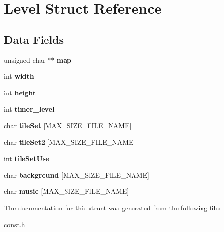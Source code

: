\hypertarget{struct_level}{\section{Level Struct Reference}
\label{struct_level}
}
\subsection*{Data Fields}
\begin{DoxyCompactItemize}
\item 
\hypertarget{struct_level_a6d985f8729c187f1c35dabba2738f0bd}{unsigned char $\ast$$\ast$ {\bfseries map}}\label{struct_level_a6d985f8729c187f1c35dabba2738f0bd}

\item 
\hypertarget{struct_level_a2474a5474cbff19523a51eb1de01cda4}{int {\bfseries width}}\label{struct_level_a2474a5474cbff19523a51eb1de01cda4}

\item 
\hypertarget{struct_level_ad12fc34ce789bce6c8a05d8a17138534}{int {\bfseries height}}\label{struct_level_ad12fc34ce789bce6c8a05d8a17138534}

\item 
\hypertarget{struct_level_a28c59da9677a9d7b98db49328a77dc3c}{int {\bfseries timer\-\_\-level}}\label{struct_level_a28c59da9677a9d7b98db49328a77dc3c}

\item 
\hypertarget{struct_level_a65e1491050070e8d940ac310bb3ee901}{char {\bfseries tile\-Set} \mbox{[}M\-A\-X\-\_\-\-S\-I\-Z\-E\-\_\-\-F\-I\-L\-E\-\_\-\-N\-A\-M\-E\mbox{]}}\label{struct_level_a65e1491050070e8d940ac310bb3ee901}

\item 
\hypertarget{struct_level_a31c790abec040f1888acf0e062d1c827}{char {\bfseries tile\-Set2} \mbox{[}M\-A\-X\-\_\-\-S\-I\-Z\-E\-\_\-\-F\-I\-L\-E\-\_\-\-N\-A\-M\-E\mbox{]}}\label{struct_level_a31c790abec040f1888acf0e062d1c827}

\item 
\hypertarget{struct_level_ad086ee40635033453f3e41bc143af7b7}{int {\bfseries tile\-Set\-Use}}\label{struct_level_ad086ee40635033453f3e41bc143af7b7}

\item 
\hypertarget{struct_level_a138d74a180ed8126b24d9b9b5b135882}{char {\bfseries background} \mbox{[}M\-A\-X\-\_\-\-S\-I\-Z\-E\-\_\-\-F\-I\-L\-E\-\_\-\-N\-A\-M\-E\mbox{]}}\label{struct_level_a138d74a180ed8126b24d9b9b5b135882}

\item 
\hypertarget{struct_level_a16d4a8b2aa62b5e644923bdf44da16f7}{char {\bfseries music} \mbox{[}M\-A\-X\-\_\-\-S\-I\-Z\-E\-\_\-\-F\-I\-L\-E\-\_\-\-N\-A\-M\-E\mbox{]}}\label{struct_level_a16d4a8b2aa62b5e644923bdf44da16f7}

\end{DoxyCompactItemize}


The documentation for this struct was generated from the following file\-:\begin{DoxyCompactItemize}
\item 
\hyperlink{const_8h}{const.\-h}\end{DoxyCompactItemize}
